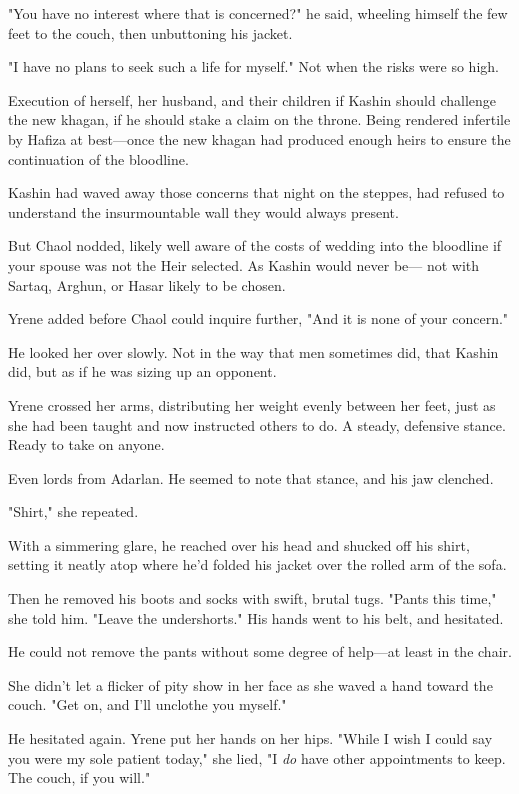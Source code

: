 "You have no interest where that is concerned?" he said, wheeling himself the few feet to the couch, then unbuttoning his jacket.

"I have no plans to seek such a life for myself." Not when the risks were so high.

Execution of herself, her husband, and their children if Kashin should challenge the new khagan, if he should stake a claim on the throne. Being rendered infertile by Hafiza at best---once the new khagan had produced enough heirs to ensure the continuation of the bloodline.

Kashin had waved away those concerns that night on the steppes, had refused to understand the insurmountable wall they would always present.

But Chaol nodded, likely well aware of the costs of wedding into the bloodline if your spouse was not the Heir selected. As Kashin would never be--- not with Sartaq, Arghun, or Hasar likely to be chosen.

Yrene added before Chaol could inquire further, "And it is none of your concern."

He looked her over slowly. Not in the way that men sometimes did, that Kashin did, but  as if he was sizing up an opponent.

Yrene crossed her arms, distributing her weight evenly between her feet, just as she had been taught and now instructed others to do. A steady, defensive stance. Ready to take on anyone.

Even lords from Adarlan. He seemed to note that stance, and his jaw clenched.

"Shirt," she repeated.

With a simmering glare, he reached over his head and shucked off his shirt, setting it neatly atop where he'd folded his jacket over the rolled arm of the sofa.

Then he removed his boots and socks with swift, brutal tugs. "Pants this time," she told him. "Leave the undershorts." His hands went to his belt, and hesitated.

He could not remove the pants without some degree of help---at least in the chair.

She didn't let a flicker of pity show in her face as she waved a hand toward the couch. "Get on, and I'll unclothe you myself."

He hesitated again. Yrene put her hands on her hips. "While I wish I could say you were my sole patient today," she lied, "I \emph{do} have other appointments to keep. The couch, if you will."

